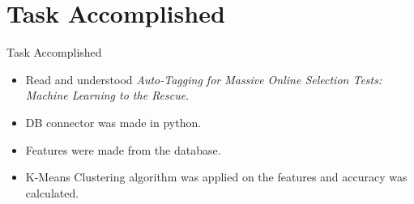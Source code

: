 \documentclass[10pt, a4paper]{beamer}
\begin{document}
\section{Task Accomplished}
\begin{frame}{Task Accomplished}
	\begin{itemize}
		\item Read and understood \textit{Auto-Tagging for Massive Online Selection Tests: Machine Learning to the Rescue}.  
		\item DB connector was made in python.
		\item Features were made from the database.
		\item K-Means Clustering algorithm was applied on the features and accuracy was calculated.
	\end{itemize}
\end{frame}
\end{document}
